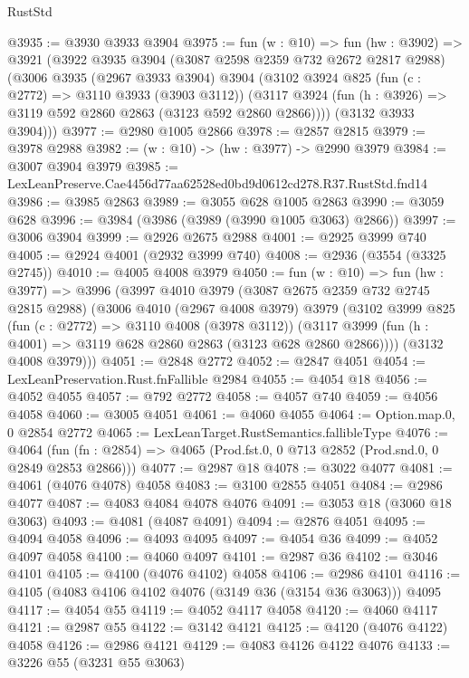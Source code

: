 \begin{lexlean}{RustStd}
\begin{coremodule}
@3935 := @3930 @3933 @3904
@3975 := fun (w : @10) =>
  fun (hw : @3902) =>
  @3921
    (@3922
      @3935
      @3904
      (@3087 @2598 @2359 @732 @2672 @2817 @2988)
      (@3006
        @3935
        (@2967 @3933 @3904)
        @3904
        (@3102
          @3924
          @825
          (fun (c : @2772) => @3110 @3933 (@3903 @3112))
          (@3117 @3924 (fun (h : @3926) => @3119 @592 @2860 @2863 (@3123 @592 @2860 @2866))))
        (@3132 @3933 @3904)))
@3977 := @2980 @1005 @2866
@3978 := @2857 @2815
@3979 := @3978 @2988
@3982 := (w : @10) -> (hw : @3977) -> @2990 @3979
@3984 := @3007 @3904 @3979
@3985 := LexLeanPreserve.Cae4456d77aa62528ed0bd9d0612cd278.R37.RustStd.fnd14
@3986 := @3985 @2863
@3989 := @3055 @628 @1005 @2863
@3990 := @3059 @628
@3996 := @3984 (@3986 (@3989 (@3990 @1005 @3063) @2866))
@3997 := @3006 @3904
@3999 := @2926 @2675 @2988
@4001 := @2925 @3999 @740
@4005 := @2924 @4001 (@2932 @3999 @740)
@4008 := @2936 (@3554 (@3325 @2745))
@4010 := @4005 @4008 @3979
@4050 := fun (w : @10) =>
  fun (hw : @3977) =>
  @3996
    (@3997
      @4010
      @3979
      (@3087 @2675 @2359 @732 @2745 @2815 @2988)
      (@3006
        @4010
        (@2967 @4008 @3979)
        @3979
        (@3102
          @3999
          @825
          (fun (c : @2772) => @3110 @4008 (@3978 @3112))
          (@3117 @3999 (fun (h : @4001) => @3119 @628 @2860 @2863 (@3123 @628 @2860 @2866))))
        (@3132 @4008 @3979)))
@4051 := @2848 @2772
@4052 := @2847 @4051
@4054 := LexLeanPreservation.Rust.fnFallible @2984
@4055 := @4054 @18
@4056 := @4052 @4055
@4057 := @792 @2772
@4058 := @4057 @740
@4059 := @4056 @4058
@4060 := @3005 @4051
@4061 := @4060 @4055
@4064 := Option.map.{0, 0} @2854 @2772
@4065 := LexLeanTarget.RustSemantics.fallibleType
@4076 := @4064
    (fun (fn : @2854) => @4065 (Prod.fst.{0, 0} @713 @2852 (Prod.snd.{0, 0} @2849 @2853 @2866)))
@4077 := @2987 @18
@4078 := @3022 @4077
@4081 := @4061 (@4076 @4078) @4058
@4083 := @3100 @2855 @4051
@4084 := @2986 @4077
@4087 := @4083 @4084 @4078 @4076
@4091 := @3053 @18 (@3060 @18 @3063)
@4093 := @4081 (@4087 @4091)
@4094 := @2876 @4051
@4095 := @4094 @4058
@4096 := @4093 @4095
@4097 := @4054 @36
@4099 := @4052 @4097 @4058
@4100 := @4060 @4097
@4101 := @2987 @36
@4102 := @3046 @4101
@4105 := @4100 (@4076 @4102) @4058
@4106 := @2986 @4101
@4116 := @4105 (@4083 @4106 @4102 @4076 (@3149 @36 (@3154 @36 @3063))) @4095
@4117 := @4054 @55
@4119 := @4052 @4117 @4058
@4120 := @4060 @4117
@4121 := @2987 @55
@4122 := @3142 @4121
@4125 := @4120 (@4076 @4122) @4058
@4126 := @2986 @4121
@4129 := @4083 @4126 @4122 @4076
@4133 := @3226 @55 (@3231 @55 @3063)

\end{coremodule}
\end{lexlean}
